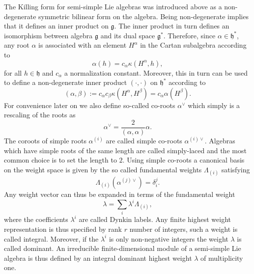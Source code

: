 The Killing form for semi-simple Lie algebras was introduced above as a non-degenerate symmetric bilinear form on the algebra. Being non-degenerate implies that it defines an inner product on $\mathfrak{g}$. The inner product in turn defines an isomorphism between algebra $\mathfrak{g}$ and its dual space $\mathfrak{g}^*$. Therefore, since $\alpha\in\mathfrak{h}^*$, any root $\alpha$ is associated with an element $H^\alpha$ in the Cartan subalgebra according to 
\begin{equation}
    \alpha(h) = c_\alpha \kappa(H^\alpha,h),
\end{equation}
for all $h\in\mathfrak{h}$ and $c_\alpha$ a normalization constant. Moreover, this in turn can be used to define a non-degenerate inner product $(\cdot,\cdot)$ on $\mathfrak{h}^*$ according to
\begin{equation}
    (\alpha,\beta):= c_\alpha c_\beta \kappa(H^\alpha,H^\beta) = c_\alpha \alpha(H^\beta).
\end{equation}
For convenience later on we also define so-called co-roots $\alpha^\vee$ which simply is a rescaling of the roots as 
\begin{equation}
    \alpha^\vee = \frac{2}{(\alpha,\alpha)}\alpha.
\end{equation}
The coroots of simple roots $\alpha^{(i)}$ are called simple co-roots $\alpha^{(i)\vee}$. Algebras which have simple roots of the same length are called simply-laced and the most common choice is to set the length to $2$. Using simple co-roots a canonical basis on the weight space is given by the so called fundamental weights $\Lambda_{(i)}$ satisfying 
\begin{equation}
    \Lambda_{(i)}(\alpha^{(j)\vee}) = \delta^j_i.
\end{equation}
Any weight vector can thus be expanded in terms of the fundamental weight 
\begin{equation}
    \lambda = \sum_i \lambda^i\Lambda_{(i)},
\end{equation}
where the coefficients $\lambda^i$ are called Dynkin labels. Any finite highest weight representation is thus specified by rank $r$ number of integers, such a weight is called integral. Moreover, if the $\lambda^i$ is only non-negative integers the weight $\lambda$ is called dominant. An irreducible finite-dimensional module of a semi-simple Lie algebra is thus defined by an integral dominant highest weight $\lambda$ of multiplicity one. 

